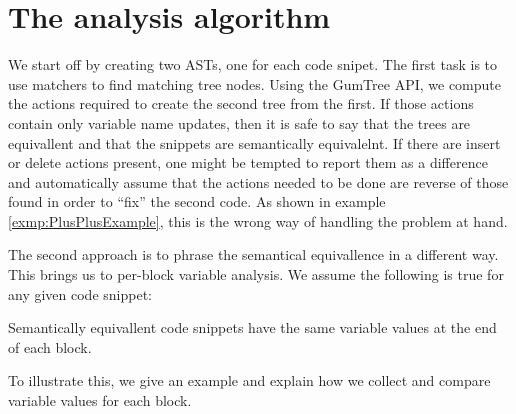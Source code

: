 \section{The analysis algorithm}
\label{sec:Algorithm}

We start off by creating two ASTs, one for each code snipet. The first task is to use matchers to find matching tree nodes. Using the GumTree API, we compute the actions required to create the second tree from the first. If those actions contain only variable name updates, then it is safe to say that the trees are equivallent and that the snippets are semantically equivalelnt. If there are insert or delete actions present, one might be tempted to report them as a difference and automatically assume that the actions needed to be done are reverse of those found in order to ``fix'' the second code. As shown in example \ref{exmp:PlusPlusExample}, this is the wrong way of handling the problem at hand.

The second approach is to phrase the semantical equivallence in a different way. This brings us to per-block variable analysis. We assume the following is true for any given code snippet:

\bigskip
\begin{assn}
    Semantically equivallent code snippets have the same variable values at the end of each block.
\end{assn}
\bigskip

To illustrate this, we give an example and explain how we collect and compare variable values for each block.

